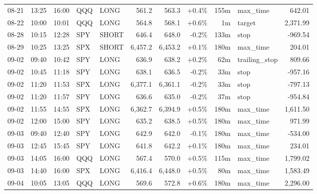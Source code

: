 \documentclass[11pt,a4paper,twoside]{article}
\begin{document}
\begin{center}
\begin{longtable}{>{\color{txtmain}}l l l l l r r r r >{\color{txtmain}}l r}
08-21 & 13:25 & 16:00 & QQQ & LONG & 561.2 & 563.3 & \textcolor{wingreen}{+0.4\%} & 155m & max\_time & \textcolor{wingreen}{642.01} \\
08-22 & 10:00 & 10:01 & QQQ & LONG & 564.8 & 568.1 & \textcolor{wingreen}{+0.6\%} & 1m & target & \textcolor{wingreen}{2,371.99} \\
08-28 & 10:15 & 12:28 & SPY & SHORT & 646.4 & 648.0 & \textcolor{lossred}{-0.2\%} & 133m & stop & \textcolor{lossred}{-969.54} \\
08-29 & 10:25 & 13:25 & SPX & SHORT & 6,457.2 & 6,453.2 & \textcolor{wingreen}{+0.1\%} & 180m & max\_time & \textcolor{wingreen}{204.01} \\
09-02 & 09:40 & 10:42 & SPY & LONG & 636.9 & 638.2 & \textcolor{wingreen}{+0.2\%} & 62m & trailing\_stop & \textcolor{wingreen}{809.66} \\
09-02 & 10:45 & 11:18 & SPY & LONG & 638.1 & 636.5 & \textcolor{lossred}{-0.2\%} & 33m & stop & \textcolor{lossred}{-957.16} \\
09-02 & 11:20 & 11:53 & SPX & LONG & 6,377.1 & 6,361.1 & \textcolor{lossred}{-0.2\%} & 33m & stop & \textcolor{lossred}{-797.13} \\
09-02 & 11:20 & 11:57 & SPY & LONG & 636.6 & 635.0 & \textcolor{lossred}{-0.2\%} & 37m & stop & \textcolor{lossred}{-954.84} \\
09-02 & 11:55 & 14:55 & SPX & LONG & 6,362.7 & 6,394.9 & \textcolor{wingreen}{+0.5\%} & 180m & max\_time & \textcolor{wingreen}{1,611.50} \\
09-02 & 12:00 & 15:00 & SPY & LONG & 635.2 & 638.5 & \textcolor{wingreen}{+0.5\%} & 180m & max\_time & \textcolor{wingreen}{971.99} \\
09-03 & 09:40 & 12:40 & SPY & LONG & 642.9 & 642.0 & \textcolor{lossred}{-0.1\%} & 180m & max\_time & \textcolor{lossred}{-534.00} \\
09-03 & 12:45 & 15:45 & SPY & LONG & 641.8 & 642.2 & \textcolor{wingreen}{+0.1\%} & 180m & max\_time & \textcolor{wingreen}{234.01} \\
09-03 & 14:05 & 16:00 & QQQ & LONG & 567.4 & 570.0 & \textcolor{wingreen}{+0.5\%} & 115m & max\_time & \textcolor{wingreen}{1,799.02} \\
09-03 & 14:40 & 16:00 & SPX & LONG & 6,416.4 & 6,448.0 & \textcolor{wingreen}{+0.5\%} & 80m & max\_time & \textcolor{wingreen}{1,583.49} \\
09-04 & 10:05 & 13:05 & QQQ & LONG & 569.6 & 572.8 & \textcolor{wingreen}{+0.6\%} & 180m & max\_time & \textcolor{wingreen}{2,296.00} \\

\end{longtable}
\end{center}
\end{document}
